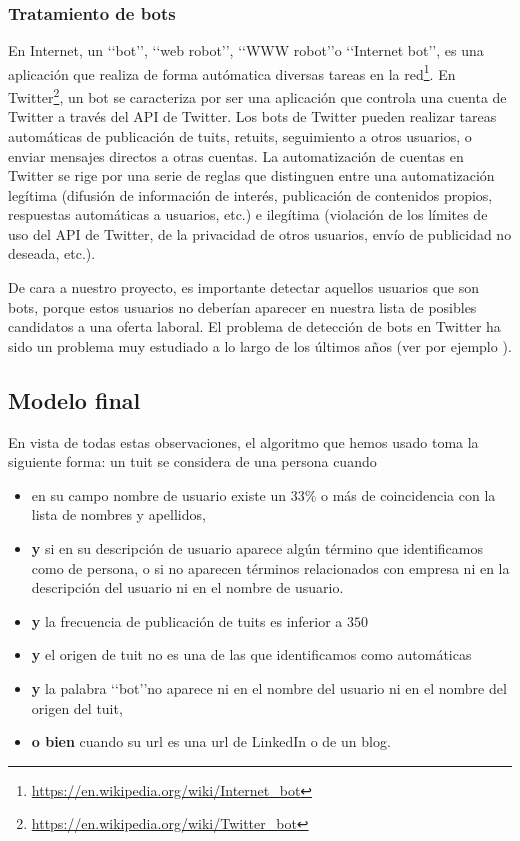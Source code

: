 \subsubsection{Tratamiento de bots}
En Internet, un \lq\lq bot\rq\rq, \lq\lq web robot\rq\rq, \lq\lq WWW robot\rq\rq o 
\lq\lq Internet bot\rq\rq, es una aplicación que realiza de forma autómatica diversas 
tareas en la red\footnote{\url{https://en.wikipedia.org/wiki/Internet_bot}}.
En Twitter\footnote{\url{https://en.wikipedia.org/wiki/Twitter_bot}},
un bot se caracteriza por ser una aplicación que controla una cuenta de Twitter a través del
API de Twitter. Los bots de Twitter pueden realizar tareas automáticas de publicación de tuits,
retuits, seguimiento a otros usuarios, o enviar mensajes directos a otras cuentas. La automatización
de cuentas en Twitter se rige por una serie de reglas que distinguen entre una automatización 
legítima (difusión de información de interés, publicación de contenidos propios, respuestas automáticas
a usuarios, etc.) e ilegítima (violación de los límites de uso del API de Twitter, de la privacidad 
de otros usuarios, envío de publicidad no deseada, etc.).

De cara a nuestro proyecto, es importante detectar aquellos usuarios que son bots, porque
estos usuarios no deberían aparecer en nuestra lista de posibles candidatos a una oferta 
laboral. El problema de detección de bots en Twitter ha sido un problema muy estudiado
a lo largo de los últimos años (ver por ejemplo \cite{user_class4}).


\subsection{Modelo final}

En vista de todas estas observaciones, el algoritmo que hemos usado toma la siguiente forma:
un tuit se considera de una persona cuando 
\begin{itemize}
\item en su campo nombre de usuario existe un $33$\% o más 
de coincidencia con la lista de nombres y apellidos, 
\item {\bf y} si en su descripción de usuario aparece algún término que
identificamos como de persona, o si no aparecen términos 
relacionados con empresa ni en la descripción del usuario ni en el nombre de usuario.
\item {\bf y} la frecuencia de publicación de tuits es inferior a $350$
\item {\bf y} el origen de tuit no es una de las que identificamos como automáticas
\item {\bf y} la palabra \lq\lq bot\rq\rq no aparece ni en el nombre del usuario ni
en el nombre del origen del tuit,
\item {\bf o bien}  cuando su url es una url de LinkedIn o de un blog.
\end{itemize}


